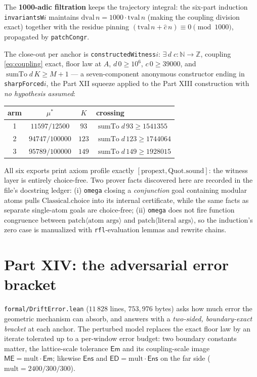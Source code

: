 \documentclass[11pt]{article}
\newcommand{\chat}{\widehat{c}}
\newcommand{\sumto}{\operatorname{sumTo}}
\begin{document}
The \textbf{1000-adic filtration} keeps the trajectory integral: the six-part induction
\texttt{invariantsW$i$} maintains $\mathrm{dval}\,n=1000\cdot\mathrm{tval}\,n$ (making the
coupling division exact) together with the residue pinning
$(\mathrm{tval}\,n+\chat\,n)\equiv 0\pmod{1000}$, propagated by \texttt{patchCongr}.

The close-out per anchor is
\texttt{constructedWitness$i$}:
$\exists\, d\; c:\mathbb{N}\to\mathbb{Z}$, coupling \eqref{eq:coupling} exact, floor law at
$A$, $d\,0\ge 10^6$, $c\,0\ge 39000$, and $\sumto d\,K\ge M+1$ --- a seven-component
anonymous constructor ending in \texttt{sharpForced$i$}, the Part XII squeeze applied to the
Part XIII construction with \emph{no hypothesis assumed}:

\begin{center}
\begin{tabular}{c c c l}
\hline
\textbf{arm} & $\mu^\ast$ & $K$ & \textbf{crossing}\\
\hline
1 & $11597/12500$ & $93$ & $\sumto d\,93\ge 1541355$\\
2 & $94747/100000$ & $123$ & $\sumto d\,123\ge 1744064$\\
3 & $95789/100000$ & $149$ & $\sumto d\,149\ge 1928015$\\
\hline
\end{tabular}
\end{center}

All six exports print axiom profile exactly $[\mathrm{propext},\mathrm{Quot.sound}]$: the
witness layer is entirely choice-free. Two prover facts discovered here are recorded in the
file's docstring ledger: (i) \texttt{omega} closing a \emph{conjunction} goal containing
modular atoms pulls $\mathrm{Classical.choice}$ into its internal certificate, while the
same facts as separate single-atom goals are choice-free; (ii) \texttt{omega} does not fire
function congruence between $\mathrm{patch}\langle\text{atom args}\rangle$ and
$\mathrm{patch}\langle\text{literal args}\rangle$, so the induction's zero case is
manualized with \texttt{rfl}-evaluation lemmas and rewrite chains.

\section{Part XIV: the adversarial error bracket}\label{sec:bracket}

\texttt{formal/DriftError.lean} ($11\,828$ lines, $753{,}976$ bytes) asks how much error the
geometric mechanism can absorb, and answers with a \emph{two-sided, boundary-exact bracket}
at each anchor. The perturbed model replaces the exact floor law by an iterate tolerated up
to a per-window error budget: two boundary constants matter, the lattice-scale tolerance
$\mathsf{Em}$ and its coupling-scale image $\mathsf{ME}=\mathrm{mult}\cdot\mathsf{Em}$;
likewise $\mathsf{Ens}$ and $\mathsf{ED}=\mathrm{mult}\cdot\mathsf{Ens}$ on the far side
($\mathrm{mult}=2400/300/300$).
\end{document}
